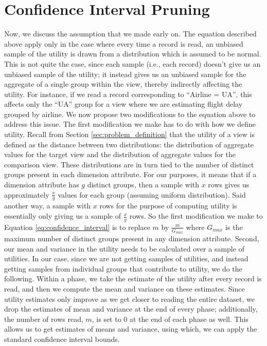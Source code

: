 \section{Confidence Interval Pruning}
Now, we discuss the assumption that we made early on.
The equation described above apply only in the case
where every time a record is read, an unbiased sample
of the utility is drawn from a distribution which
is assumed to be normal. 
This is not quite the case, since each sample (i.e., each record)
doesn't give us an unbiased sample of the utility;
it instead gives us an unbiased sample for the aggregate
of a single group within the view, thereby indirectly affecting
the utility.
For instance, if we read a record corresponding to 
``Airline = UA'', this affects only the ``UA'' group
for a view where we are estimating flight delay grouped by airline.
We now propose two modifications to the equation above to address this issue.
The first modification we make has to do with how we define utility.
Recall from Section \ref{sec:problem_definition} 
that the utility of a view is
defined as the distance between two distributions: 
the distribution of aggregate values for the
target view and the distribution of aggregate values for the comparison view.
These distributions are in turn tied to the 
number of distinct groups present in
each dimension attribute.
For our purposes, it means that if a dimension attribute has $g$ distinct
groups, then a sample with $x$ rows gives us approximately $\frac{x}{g}$ 
values for each group (assuming uniform distribution).
Said another way, a sample with $x$ rows for the purpose of computing 
utility is essentially only giving us a sample of $\frac{x}{g}$ rows.
So the first modification we 
make to Equation \ref{eq:confidence_interval} is to
replace $m$ by $\frac{m}{G_{max}}$ where $G_{max}$ is the maximum number of
distinct groups present in any dimension attribute.
Second, our mean and variance in the utility needs to be calculated 
over a sample of utilities. 
In our case, since we are not getting samples of utilities, 
and instead getting samples from individual groups that contribute
to utility, we do the following. 
Within a phase, we take the estimate of the utility after every
record is read, and then we compute the mean and variance on these estimates.
Since utility estimates only improve as we get closer to reading 
the entire dataset, we drop the estimates of mean and variance at the end
of every phase; additionally, the number of rows read, $m$, is set to $0$
at the end of each phase as well. This allows us to get estimates
of means and variance, using which, we can apply the standard 
confidence interval bounds.
